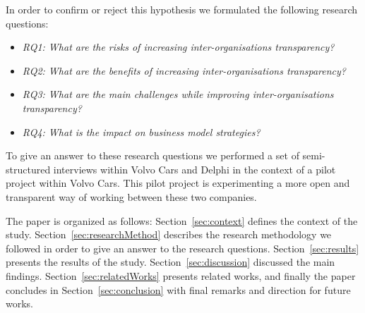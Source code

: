 In order to confirm or reject this hypothesis we formulated the following research questions: %

\begin{itemize}
\item {\em RQ1: What are the risks of increasing inter-organisations transparency?}
\item {\em RQ2: What are the benefits of increasing inter-organisations transparency?} %
\item {\em RQ3: What are the main challenges while improving inter-organisations transparency?}
\item {\em RQ4: What is the impact on business model strategies?}
\end{itemize}

To give an answer to these research questions we performed a set of semi-structured interviews within Volvo Cars and Delphi in the context of a pilot project within Volvo Cars. This pilot project is experimenting a more open and transparent way of working between these two companies.


The paper is organized as follows: Section~\ref{sec:context} defines the context of the study. Section~\ref{sec:researchMethod} describes the research methodology we followed in order to give an answer to the research questions. Section~\ref{sec:results} presents the results of the study. Section~\ref{sec:discussion} discussed the main findings. Section~\ref{sec:relatedWorks} presents related works, and finally the paper concludes in Section~\ref{sec:conclusion} with final remarks and direction for future works.